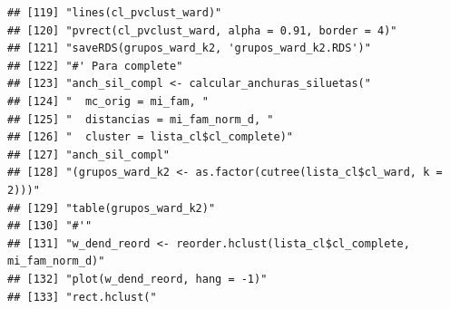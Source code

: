 \documentclass[11pt,]{article}
\begin{document}
\begin{verbatim}
## [119] "lines(cl_pvclust_ward)"                                                                                                                                                
## [120] "pvrect(cl_pvclust_ward, alpha = 0.91, border = 4)"                                                                                                                     
## [121] "saveRDS(grupos_ward_k2, 'grupos_ward_k2.RDS')"                                                                                                                         
## [122] "#' Para complete"                                                                                                                                                      
## [123] "anch_sil_compl <- calcular_anchuras_siluetas("                                                                                                                         
## [124] "  mc_orig = mi_fam, "                                                                                                                                                  
## [125] "  distancias = mi_fam_norm_d, "                                                                                                                                        
## [126] "  cluster = lista_cl$cl_complete)"                                                                                                                                     
## [127] "anch_sil_compl"                                                                                                                                                        
## [128] "(grupos_ward_k2 <- as.factor(cutree(lista_cl$cl_ward, k = 2)))"                                                                                                        
## [129] "table(grupos_ward_k2)"                                                                                                                                                 
## [130] "#'"                                                                                                                                                                    
## [131] "w_dend_reord <- reorder.hclust(lista_cl$cl_complete, mi_fam_norm_d)"                                                                                                   
## [132] "plot(w_dend_reord, hang = -1)"                                                                                                                                         
## [133] "rect.hclust("                                                                                                                                                          

\end{verbatim}
\end{document}
